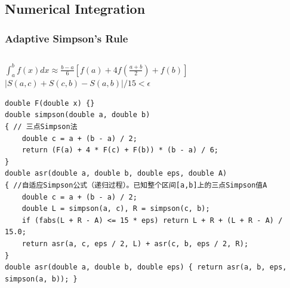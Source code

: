 \documentclass[twoside]{article}
\begin{document}
\subsection{Numerical Integration}
\subsubsection{Adaptive Simpson's Rule}
\begin{lstlisting}
\end{lstlisting}
$\int _a^b f(x)dx  \approx \frac{b-a}{6}[f(a)+4f(\frac{a+b}{2})+f(b)]$\\
$|S(a, c) + S(c, b) - S(a, b)| / 15 < \epsilon$
\begin{lstlisting}
double F(double x) {}
double simpson(double a, double b)
{ // 三点Simpson法
    double c = a + (b - a) / 2;
    return (F(a) + 4 * F(c) + F(b)) * (b - a) / 6;
}
double asr(double a, double b, double eps, double A)
{ //自适应Simpson公式（递归过程）。已知整个区间[a,b]上的三点Simpson值A
    double c = a + (b - a) / 2;
    double L = simpson(a, c), R = simpson(c, b);
    if (fabs(L + R - A) <= 15 * eps) return L + R + (L + R - A) / 15.0;
    return asr(a, c, eps / 2, L) + asr(c, b, eps / 2, R);
}
double asr(double a, double b, double eps) { return asr(a, b, eps, simpson(a, b)); }
\end{lstlisting}
\end{document}

